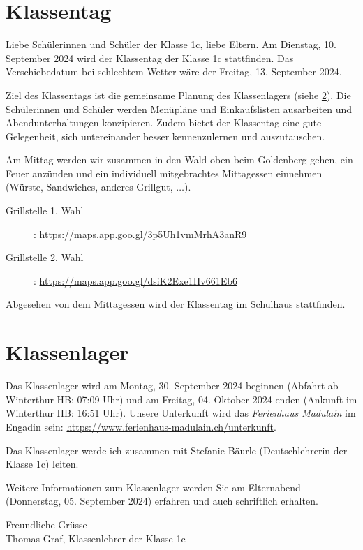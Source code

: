 \thispagestyle{empty}

\section{Klassentag}\label{sec:tag}

Liebe Schülerinnen und Schüler der Klasse 1c, liebe Eltern. Am Dienstag, 10. September 2024 wird der Klassentag der Klasse 1c stattfinden. Das Verschiebedatum bei schlechtem Wetter wäre der Freitag, 13. September 2024. 

Ziel des Klassentags ist die gemeinsame Planung des Klassenlagers (siehe \cref{sec:lager}). Die Schülerinnen und Schüler werden Menüpläne und Einkaufslisten ausarbeiten und Abendunterhaltungen konzipieren. 
Zudem bietet der Klassentag eine gute Gelegenheit, sich untereinander besser kennenzulernen und auszutauschen.

Am Mittag werden wir zusammen in den Wald oben beim Goldenberg gehen, ein Feuer anzünden und ein individuell mitgebrachtes Mittagessen einnehmen (Würste, Sandwiches, anderes Grillgut, $\ldots$).

\begin{description}
  \item[Grillstelle 1. Wahl]: \url{https://maps.app.goo.gl/3p5Uh1vmMrhA3anR9}
  \item[Grillstelle 2. Wahl]: \url{https://maps.app.goo.gl/dsiK2Exe1Hv661Eb6}
\end{description}

Abgesehen von dem Mittagessen wird der Klassentag im Schulhaus stattfinden.



\section{Klassenlager}\label{sec:lager}
Das Klassenlager wird am Montag, 30. September 2024 beginnen (Abfahrt ab Winterthur HB: 07:09 Uhr) und am Freitag, 04. Oktober 2024 enden (Ankunft im Winterthur HB: 16:51 Uhr). Unsere Unterkunft wird das \textit{Ferienhaus Madulain} im Engadin sein: \url{https://www.ferienhaus-madulain.ch/unterkunft}.

Das Klassenlager werde ich zusammen mit Stefanie Bäurle (Deutschlehrerin der Klasse 1c) leiten.

Weitere Informationen zum Klassenlager werden Sie am Elternabend (Donnerstag, 05. September 2024) erfahren und auch schriftlich erhalten.


\vspace{10cm}
Freundliche Grüsse\\
Thomas Graf, Klassenlehrer der Klasse 1c



